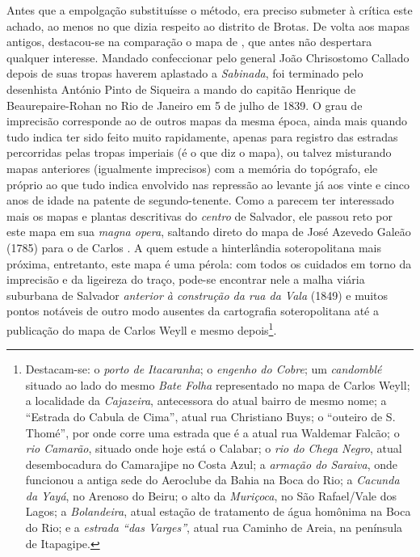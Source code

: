 Antes que a empolgação substituísse o método, era preciso submeter à crítica este achado, ao menos no que dizia respeito ao distrito de Brotas. De volta aos mapas antigos, destacou-se na comparação o mapa de , que antes não despertara qualquer interesse. Mandado confeccionar pelo general João Chrisostomo Callado depois de suas tropas haverem aplastado a \textit{Sabinada}, foi terminado pelo desenhista António Pinto de Siqueira a mando do capitão Henrique de Beaurepaire-Rohan no Rio de Janeiro em 5 de julho de 1839. O grau de imprecisão corresponde ao de outros mapas da mesma época, ainda mais quando tudo indica ter sido feito muito rapidamente, apenas para registro das estradas percorridas pelas tropas imperiais (é o que diz o mapa), ou talvez misturando mapas anteriores (igualmente imprecisos) com a memória do topógrafo, ele próprio ao que tudo indica envolvido nas repressão ao levante já aos vinte e cinco anos de idade na patente de segundo-tenente. Como a  parecem ter interessado mais os mapas e plantas descritivas do \textit{centro} de Salvador, ele passou reto por este mapa em sua \textit{magna opera}, saltando direto do mapa de José Azevedo Galeão (1785) para o de Carlos . A quem estude a hinterlândia soteropolitana mais próxima, entretanto, este mapa é uma pérola: com todos os cuidados em torno da imprecisão e da ligeireza do traço, pode-se encontrar nele a malha viária suburbana de Salvador \textit{anterior à construção da rua da Vala} (1849) e muitos pontos notáveis de outro modo ausentes da cartografia soteropolitana até a publicação do mapa de Carlos Weyll e mesmo depois\footnote{Destacam-se: o \textit{porto de Itacaranha}; o \textit{engenho do Cobre}; um \textit{candomblé} situado ao lado do mesmo \textit{Bate Folha} representado no mapa de Carlos Weyll; a localidade da \textit{Cajazeira}, antecessora do atual bairro de mesmo nome; a ``Estrada do Cabula de Cima'', atual rua Christiano Buys; o ``outeiro de S. Thomé'', por onde corre uma estrada que é a atual rua Waldemar Falcão; o \textit{rio Camarão}, situado onde hoje está o Calabar; o \textit{rio do Chega Negro}, atual desembocadura do Camarajipe no Costa Azul; a \textit{armação do Saraiva}, onde funcionou a antiga sede do Aeroclube da Bahia na Boca do Rio; a \textit{Cacunda da Yayá}, no Arenoso do Beiru; o alto da \textit{Muriçoca}, no São Rafael/Vale dos Lagos; a \textit{Bolandeira}, atual estação de tratamento de água homônima na Boca do Rio; e a \textit{estrada ``das Varges''}, atual rua Caminho de Areia, na península de Itapagipe.}. 

